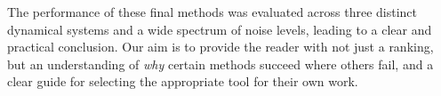 The performance of these final methods was evaluated across three distinct dynamical systems and a wide spectrum of noise levels, leading to a clear and practical conclusion. Our aim is to provide the reader with not just a ranking, but an understanding of \textit{why} certain methods succeed where others fail, and a clear guide for selecting the appropriate tool for their own work.
